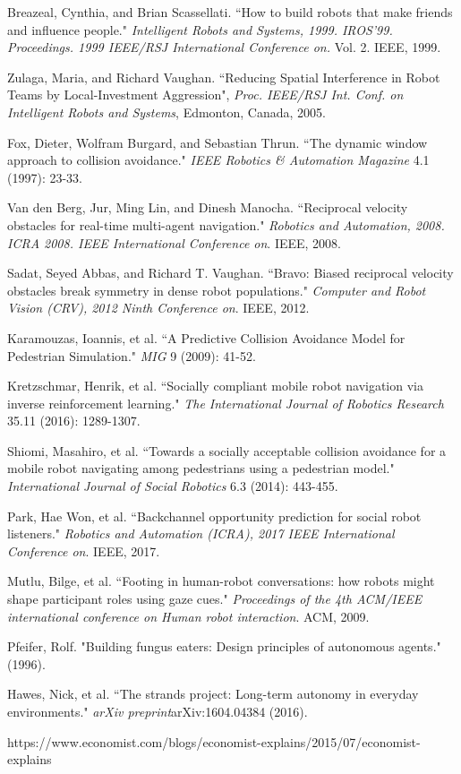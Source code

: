 \documentclass[letterpaper, 10 pt, conference]{ieeeconf}  %
\begin{document}
\begin{thebibliography}{99}

 Breazeal, Cynthia, and Brian Scassellati. ``How to build robots that make friends and influence people." \textit{Intelligent Robots and Systems, 1999. IROS'99. Proceedings. 1999 IEEE/RSJ International Conference on.} Vol. 2. IEEE, 1999.

 Zulaga, Maria, and Richard Vaughan. ``Reducing Spatial Interference in Robot Teams by Local-Investment Aggression", \textit{Proc. IEEE/RSJ Int. Conf. on Intelligent Robots and Systems}, Edmonton, Canada, 2005.

 Fox, Dieter, Wolfram Burgard, and Sebastian Thrun. ``The dynamic window approach to collision avoidance." \textit{IEEE Robotics & Automation Magazine} 4.1 (1997): 23-33.

 Van den Berg, Jur, Ming Lin, and Dinesh Manocha. ``Reciprocal velocity obstacles for real-time multi-agent navigation." \textit{Robotics and Automation, 2008. ICRA 2008. IEEE International Conference on}. IEEE, 2008.

 Sadat, Seyed Abbas, and Richard T. Vaughan. ``Bravo: Biased reciprocal velocity obstacles break symmetry in dense robot populations." \textit{Computer and Robot Vision (CRV), 2012 Ninth Conference on}. IEEE, 2012.

 Karamouzas, Ioannis, et al. ``A Predictive Collision Avoidance Model for Pedestrian Simulation." \textit{MIG} 9 (2009): 41-52.

 Kretzschmar, Henrik, et al. ``Socially compliant mobile robot navigation via inverse reinforcement learning." \textit{The International Journal of Robotics Research} 35.11 (2016): 1289-1307.

 Shiomi, Masahiro, et al. ``Towards a socially acceptable collision avoidance for a mobile robot navigating among pedestrians using a pedestrian model." \textit{International Journal of Social Robotics} 6.3 (2014): 443-455.

 Park, Hae Won, et al. ``Backchannel opportunity prediction for social robot listeners." \textit{Robotics and Automation (ICRA), 2017 IEEE International Conference on}. IEEE, 2017.

 Mutlu, Bilge, et al. ``Footing in human-robot conversations: how robots might shape participant roles using gaze cues." \textit{Proceedings of the 4th ACM/IEEE international conference on Human robot interaction}. ACM, 2009.


 Pfeifer, Rolf. "Building fungus eaters: Design principles of autonomous agents." (1996).

 Hawes, Nick, et al. ``The strands project: Long-term autonomy in everyday environments." \textit{arXiv preprint}arXiv:1604.04384 (2016).

 https://www.economist.com/blogs/economist-explains/2015/07/economist-explains 

\end{thebibliography}
\end{document}
